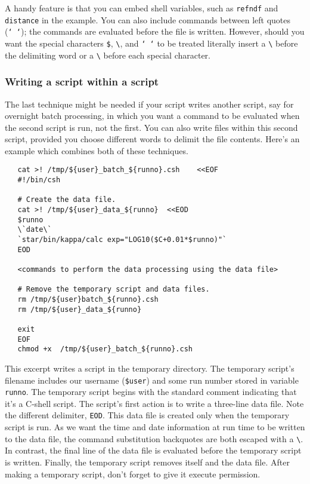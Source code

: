 \documentclass[twoside,11pt]{article}
\newcommand{\htmlref}[2]{#1}
\newcommand{\xlabel}[1]{}
\begin{document}
A handy feature is that you can embed \htmlref{{\sf shell
variables}}{sc4_gl_she_var}, such as {\tt refndf} and {\tt distance}
in the example.  You can also include commands between left quotes
({\tt `~`}); the commands are evaluated before the file is written.
However, should you want the special characters {\tt \$}, \verb+\+,
and {\tt `~`} to be treated literally insert a \verb+\+ before the
delimiting word or a \verb+\+ before each special character.

\subsubsection{\xlabel{sc4_se_write_script}Writing a script within a
script\label{sc4_se_write_script}}

The last technique might be needed if your script writes another
script, say for overnight batch processing, in which you want a command
to be evaluated when the second script is run, not the first.
You can also write files within this second script, provided you choose
different words to delimit the file contents.  Here's an example which
combines both of these techniques.

\small
\begin{verbatim}
   cat >! /tmp/${user}_batch_${runno}.csh    <<EOF
   #!/bin/csh

   # Create the data file.
   cat >! /tmp/${user}_data_${runno}  <<EOD
   $runno
   \`date\`
   `star/bin/kappa/calc exp="LOG10($C+0.01*$runno)"`
   EOD

   <commands to perform the data processing using the data file>

   # Remove the temporary script and data files.
   rm /tmp/${user}batch_${runno}.csh
   rm /tmp/${user}_data_${runno}

   exit
   EOF
   chmod +x  /tmp/${user}_batch_${runno}.csh
\end{verbatim}
\normalsize

This excerpt writes a script in the temporary directory.  The
temporary script's filename includes our username ({\tt \$user}) and
some run number stored in variable {\tt runno}.  The temporary script
begins with the standard comment indicating that it's a C-shell
script.  The script's first action is to write a three-line data file.
Note the different delimiter, {\tt EOD}.  This data file is created
only when the temporary script is run.  As we want the time and date
information at run time to be written to the data file, the command
substitution backquotes are both escaped with a \verb+\+.  In
contrast, the final line of the data file is evaluated before the
temporary script is written.  Finally, the temporary script removes
itself and the data file.  After making a temporary script, don't
forget to give it execute permission.
\end{document}
